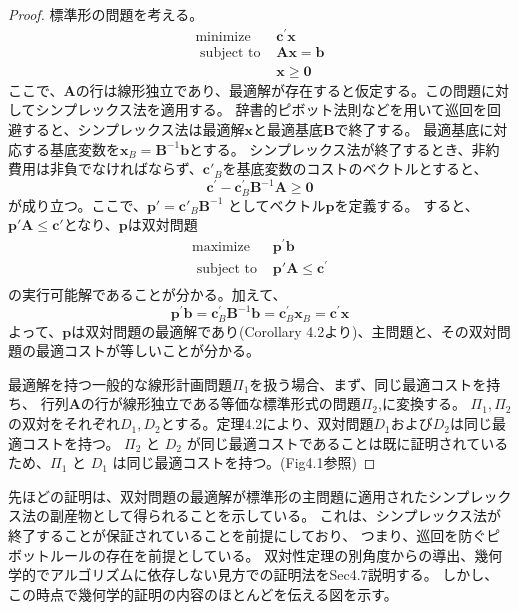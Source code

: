 \documentclass{jsarticle}
\begin{document}
\begin{proof}
  標準形の問題を考える。
  \begin{equation}
    \begin{array}{rr}
    \operatorname{minimize} & \mathbf{c}^{\prime} \mathbf{x} \\
    \text { subject to } & \mathbf{A x}=\mathbf{b} \\
    & \mathbf{x} \geq \mathbf{0}
    \end{array}
  \end{equation}
  ここで、$\bm{A}$の行は線形独立であり、最適解が存在すると仮定する。この問題に対してシンプレックス法を適用する。
  辞書的ピボット法則などを用いて巡回を回避すると、シンプレックス法は最適解$\bm{x}$と最適基底$\bm{B}$で終了する。
  最適基底に対応する基底変数を$\bm{x}_B=\bm{B}^{-1}\bm{b}$とする。
  シンプレックス法が終了するとき、非約費用は非負でなければならず、$\bm{c}'_B$を基底変数のコストのベクトルとすると、
  \begin{equation}
    \mathbf{c}^{\prime}-\mathbf{c}_{B}^{\prime} \mathbf{B}^{-1} \mathbf{A} \geq \mathbf{0}
  \end{equation}
  が成り立つ。ここで、$\bm{p}' = \bm{c}'_B\bm{B}^{-1}$ としてベクトル$\bm{p}$を定義する。
  すると、$\bm{p}'\bm{A} \leq \bm{c}'$となり、$\bm{p}$は双対問題
  \begin{equation}
    \begin{array}{cc}
    \operatorname{maximize} & \mathbf{p}^{\prime} \mathbf{b} \\
    \text { subject to } & \mathbf{p'A}\leq \mathbf{c}^{\prime} \\
    \end{array}
  \end{equation}
  の実行可能解であることが分かる。加えて、
  \begin{equation}
    \mathbf{p}^{\prime} \mathbf{b}=\mathbf{c}_{B}^{\prime} \mathbf{B}^{-1} \mathbf{b}=\mathbf{c}_{B}^{\prime} \mathbf{x}_{B}=\mathbf{c}^{\prime} \mathbf{x}
  \end{equation}
  よって、$\bm{p}$は双対問題の最適解であり(Corollary 4.2より)、主問題と、その双対問題の最適コストが等しいことが分かる。
  
  最適解を持つ一般的な線形計画問題$\Pi_1$を扱う場合、まず、同じ最適コストを持ち、
  行列$\bm{A}$の行が線形独立である等価な標準形式の問題$\Pi_2$,に変換する。
  $\Pi_1,\Pi_2$の双対をそれぞれ$D_1,D_2$とする。定理4.2により、双対問題$D_1$および$D_2$は同じ最適コストを持つ。
  $\Pi_2$ と $D_2$ が同じ最適コストであることは既に証明されているため、$\Pi_1$ と $D_1$ は同じ最適コストを持つ。(Fig4.1参照)
\end{proof}
先ほどの証明は、双対問題の最適解が標準形の主問題に適用されたシンプレックス法の副産物として得られることを示している。
これは、シンプレックス法が終了することが保証されていることを前提にしており、
つまり、巡回を防ぐピボットルールの存在を前提としている。
双対性定理の別角度からの導出、幾何学的でアルゴリズムに依存しない見方での証明法をSec4.7説明する。
しかし、この時点で幾何学的証明の内容のほとんどを伝える図を示す。
\end{document}

